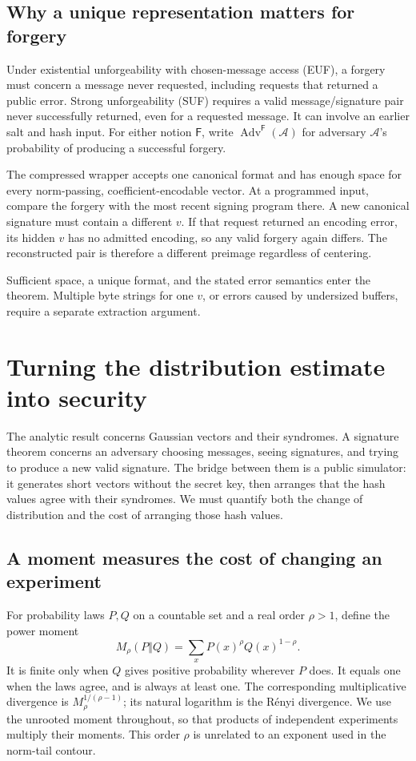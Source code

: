 \documentclass[11pt,a4paper]{article}
\theoremstyle{definition}
\theoremstyle{remark}
\numberwithin{equation}{section}
\begin{document}
\subsection{Why a unique representation matters for forgery}

Under existential unforgeability with chosen-message access (EUF), a forgery must concern a message never requested, including requests that returned a public error. Strong unforgeability (SUF) requires a valid message/signature pair never successfully returned, even for a requested message. It can involve an earlier salt and hash input. For either notion $\mathsf F$, write $\operatorname{Adv}^{\mathsf F}(\mathcal A)$ for adversary $\mathcal A$'s probability of producing a successful forgery.

The compressed wrapper accepts one canonical format and has enough space for every norm-passing, coefficient-encodable vector. At a programmed input, compare the forgery with the most recent signing program there. A new canonical signature must contain a different $v$. If that request returned an encoding error, its hidden $v$ has no admitted encoding, so any valid forgery again differs. The reconstructed pair is therefore a different preimage regardless of centering.

Sufficient space, a unique format, and the stated error semantics enter the theorem. Multiple byte strings for one $v$, or errors caused by undersized buffers, require a separate extraction argument.


\section{Turning the distribution estimate into security}

The analytic result concerns Gaussian vectors and their syndromes. A signature
theorem concerns an adversary choosing messages, seeing signatures, and trying
to produce a new valid signature. The bridge between them is a public simulator:
it generates short vectors without the secret key, then arranges that the hash
values agree with their syndromes. We must quantify both the change of
distribution and the cost of arranging those hash values.

\subsection{A moment measures the cost of changing an experiment}

For probability laws $P,Q$ on a countable set and a real order $\rho>1$, define
the power moment
\begin{equation}
 M_\rho(P\Vert Q)=\sum_x P(x)^\rho Q(x)^{1-\rho}.
 \label{eq:power-moment}
\end{equation}
It is finite only when $Q$ gives positive probability wherever $P$ does.
It equals one when the laws agree, and is always at least one. The corresponding
multiplicative divergence is $M_\rho^{1/(\rho-1)}$; its natural logarithm is the
R\'enyi divergence. We use the unrooted moment throughout, so that products
of independent experiments multiply their moments. This order $\rho$ is
unrelated to an exponent used in the norm-tail contour.
\end{document}

